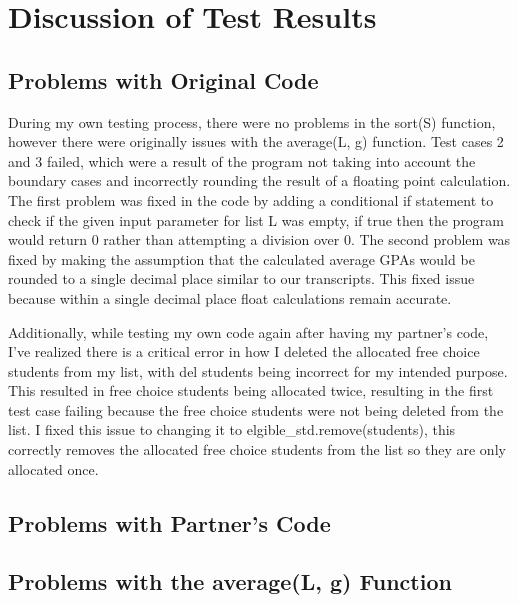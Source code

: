 \documentclass[12pt]{article}
\begin{document}
\newpage

\section{Discussion of Test Results}

\subsection{Problems with Original Code}

During my own testing process, there were no problems in the sort(S) function, however there were originally issues with the average(L, g) function. Test cases 2 and 3 failed, which were a result of the program not taking into account the boundary cases and incorrectly rounding the result of a floating point calculation. The first problem was fixed in the code by adding a conditional if statement to check if the given input parameter for list L was empty, if true then the program would return 0 rather than attempting a division over 0. The second problem was fixed by making the assumption that the calculated average GPAs would be rounded to a single decimal place similar to our transcripts. This fixed issue because within a single decimal place float calculations remain accurate.

Additionally, while testing my own code again after having my partner's code, I've realized there is a critical error in how I deleted the allocated free choice students from my list, with del students being incorrect for my intended purpose. This resulted in free choice students being allocated twice, resulting in the first test case failing because the free choice students were not being deleted from the list. I fixed this issue to changing it to elgible\_std.remove(students), this correctly removes the allocated free choice students from the list so they are only allocated once.

\subsection{Problems with Partner's Code}

\subsection{Problems with the average(L, g) Function}
\end{document}
